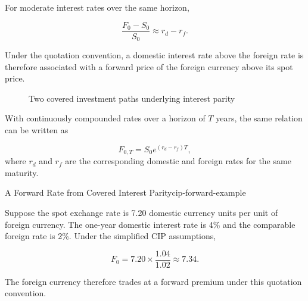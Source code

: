 For moderate interest rates over the same horizon,

\begin{equation}
\frac{F_0-S_0}{S_0}
\approx
r_d-r_f.
\label{eq:ch10-forward-premium-approx}
\end{equation}

Under the quotation convention, a domestic interest rate above the foreign rate is therefore associated with a forward price of the foreign currency above its spot price.

\begin{figure}[H]
\centering
{}
\caption{Two covered investment paths underlying interest parity}
\label{fig:ch10-cip-paths}
\end{figure}

With continuously compounded rates over a horizon of $T$ years, the same relation can be written as

\begin{equation}
F_{0,T}
=S_0 e^{(r_d-r_f)T},
\label{eq:ch10-cip-continuous}
\end{equation}
where $r_d$ and $r_f$ are the corresponding domestic and foreign rates for the same maturity.

\begin{example}{A Forward Rate from Covered Interest Parity}{cip-forward-example}

Suppose the spot exchange rate is 7.20 domestic currency units per unit of foreign currency. The one-year domestic interest rate is 4\% and the comparable foreign rate is 2\%. Under the simplified CIP assumptions,

$$
F_0
=
7.20\times\frac{1.04}{1.02}
\approx
7.34.
$$

The foreign currency therefore trades at a forward premium under this quotation convention.

\end{example}

